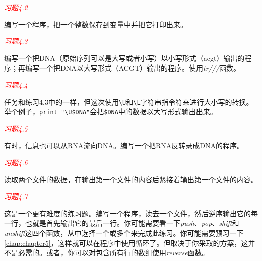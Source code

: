 \noindent
\textcolor{red}{\textit{习题4.2}}
\begin{adjustwidth}{1cm}{}
编写一个程序，把一个整数保存到变量中并把它打印出来。
\end{adjustwidth}

\noindent
\textcolor{red}{\textit{习题4.3}}
\begin{adjustwidth}{1cm}{}
编写一个把DNA（原始序列可以是大写或者小写）以小写形式（acgt）输出的程序；再编写一个把DNA以大写形式（ACGT）输出的程序。使用\textit{tr///}函数。
\end{adjustwidth}

\noindent
\textcolor{red}{\textit{习题4.4}}
\begin{adjustwidth}{1cm}{}
任务和练习4.3中的一样，但这次使用\verb|\U|和\verb|\L|字符串指令符来进行大小写的转换。举个例子，\verb|print "\U$DNA"|会把\verb|$DNA|中的数据以大写形式输出出来。
\end{adjustwidth}

\noindent
\textcolor{red}{\textit{习题4.5}}
\begin{adjustwidth}{1cm}{}
有时，信息也可以从RNA流向DNA。编写一个把RNA反转录成DNA的程序。
\end{adjustwidth}

\noindent
\textcolor{red}{\textit{习题4.6}}
\begin{adjustwidth}{1cm}{}
读取两个文件的数据，在输出第一个文件的内容后紧接着输出第一个文件的内容。
\end{adjustwidth}

\noindent
\textcolor{red}{\textit{习题4.7}}
\begin{adjustwidth}{1cm}{}
这是一个更有难度的练习题。编写一个程序，读去一个文件，然后逆序输出它的每一行，也就是首先输出它的最后一行。你可能需要看一下\textit{push}、\textit{pop}、\textit{shift}和\textit{unshift}这四个函数，从中选择一个或多个来完成此练习。你可能需要预习一下\autoref{chap:chapter5}，这样就可以在程序中使用循环了。但取决于你采取的方案，这并不是必需的。或者，你可以对包含所有行的数组使用\textit{reverse}函数。
\end{adjustwidth}

